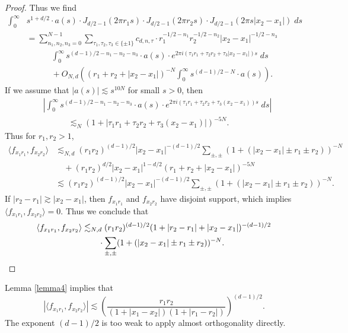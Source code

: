 \begin{proof}
    Thus we find
    \begin{align*}
        \int_0^\infty & s^{1 + d/2} \cdot a(s) \cdot J_{d/2 - 1}(2 \pi r_1 s) \cdot J_{d/2 - 1}(2 \pi r_2 s) \cdot J_{d/2 - 1}(2 \pi s |x_2 - x_1|)\; ds\\
        &= \sum_{n_1,n_2,n_3 = 0}^{N-1} \sum_{\tau_1,\tau_2,\tau_3 \in \{ \pm 1 \}} c_{d,n,\tau} \cdot r_1^{-1/2-n_1} r_2^{-1/2-n_2} |x_2 - x_1|^{-1/2-n_3}\\
        &\quad\quad\quad\int_0^\infty s^{(d-1)/2-n_1-n_2-n_3} \cdot a(s) \cdot e^{2 \pi i (\tau_1 r_1  + \tau_2 r_2  + \tau_3 |x_2 - x_1| ) s}\; ds \\
        &\quad\quad\quad + O_{N,d} \left( (r_1 + r_2 + |x_2 - x_1|)^{-N} \int_0^\infty s^{(d-1)/2-N} \cdot a(s) \right).
    \end{align*}
    If we assume that $|a(s)| \lesssim s^{10N}$ for small $s > 0$, then
    \begin{align*}
        &\left| \int_0^\infty s^{(d-1)/2-n_1-n_2-n_3} \cdot a(s) \cdot e^{2 \pi i (\tau_1 r_1  + \tau_2 r_2  + \tau_3 (x_2 - x_1) ) s}\; ds \right|\\
        &\quad\quad\quad\lesssim_N (1 + |\tau_1 r_1 + \tau_2 r_2 + \tau_3 (x_2 - x_1)|)^{-5N}.
    \end{align*}
    Thus for $r_1,r_2 > 1$,
    \begin{align*}
        \langle f_{x_1 r_1}, f_{x_2 r_2} \rangle &\lesssim_{N,d} (r_1 r_2)^{(d-1)/2} |x_2 - x_1|^{-(d-1)/2} \sum_{\pm,\pm} (1 + (|x_2 - x_1| \pm r_1 \pm r_2))^{-N}\\
        &\quad + (r_1r_2)^{d/2} |x_2 - x_1|^{1 - d/2} (r_1 + r_2 + |x_2 - x_1|)^{-5N}\\
        &\lesssim (r_1 r_2)^{(d-1)/2} |x_2 - x_1|^{-(d-1)/2} \sum_{\pm,\pm} (1 + (|x_2 - x_1| \pm r_1 \pm r_2))^{-N}.
    \end{align*}
    If $|r_2 - r_1| \gtrsim |x_2 - x_1|$, then $f_{x_1r_1}$ and $f_{x_2r_2}$ have disjoint support, which implies $\langle f_{x_1r_1}, f_{x_2r_2} \rangle = 0$. Thus we conclude that
    \begin{align*}
        \langle f_{x_1 r_1}, f_{x_2 r_2} \rangle &\lesssim_{N,d} (r_1 r_2)^{(d-1)/2} (1 + |r_2 - r_1| + |x_2 - x_1|)^{-(d-1)/2}\\
        &\quad\quad \cdot \sum_{\pm,\pm} (1 + (|x_2 - x_1| \pm r_1 \pm r_2))^{-N}. \qedhere
    \end{align*}
\end{proof}

Lemma \ref{lemma4} implies that
%
\[ |\langle f_{x_1r_1}, f_{x_2r_2} \rangle| \lesssim \left( \frac{r_1r_2}{(1 + |x_1 - x_2|)(1 + |r_1 - r_2|)} \right)^{(d-1)/2}. \]
%
The exponent $(d-1)/2$ is too weak to apply almost orthogonality directly. 






